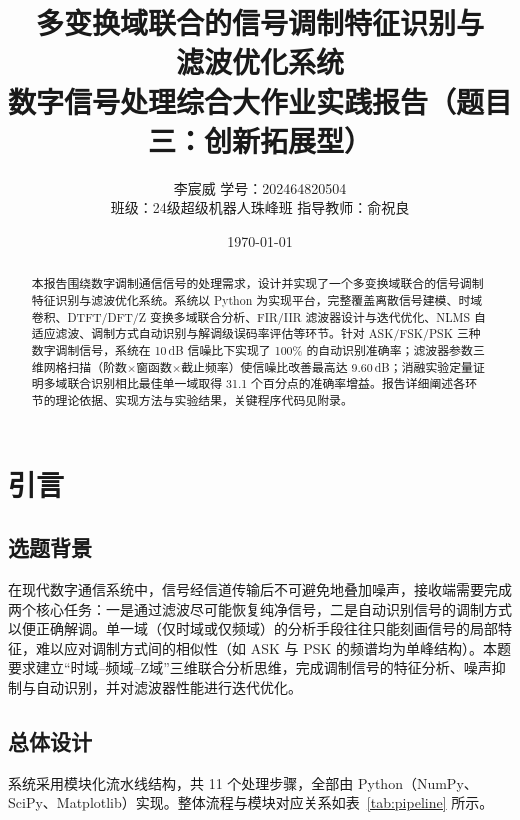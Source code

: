 \documentclass[12pt, a4paper, UTF8]{ctexart}
\title{\textbf{多变换域联合的信号调制特征识别与\\滤波优化系统}\\[0.5em]
\large 数字信号处理综合大作业实践报告（题目三：创新拓展型）}
\author{李宸威 \quad 学号：202464820504 \\[0.4em]
班级：24级超级机器人珠峰班 \quad 指导教师：俞祝良}
\date{\today}
\begin{document}
\maketitle

\begin{abstract}
本报告围绕数字调制通信信号的处理需求，设计并实现了一个多变换域联合的信号调制特征识别与滤波优化系统。系统以 Python 为实现平台，完整覆盖离散信号建模、时域卷积、DTFT/DFT/Z 变换多域联合分析、FIR/IIR 滤波器设计与迭代优化、NLMS 自适应滤波、调制方式自动识别与解调级误码率评估等环节。针对 ASK/FSK/PSK 三种数字调制信号，系统在 10\,dB 信噪比下实现了 100\% 的自动识别准确率；滤波器参数三维网格扫描（阶数$\times$窗函数$\times$截止频率）使信噪比改善最高达 9.60\,dB；消融实验定量证明多域联合识别相比最佳单一域取得 31.1 个百分点的准确率增益。报告详细阐述各环节的理论依据、实现方法与实验结果，关键程序代码见附录。
\end{abstract}

\tableofcontents
\newpage

\section{引言}

\subsection{选题背景}

在现代数字通信系统中，信号经信道传输后不可避免地叠加噪声，接收端需要完成两个核心任务：一是通过滤波尽可能恢复纯净信号，二是自动识别信号的调制方式以便正确解调。单一域（仅时域或仅频域）的分析手段往往只能刻画信号的局部特征，难以应对调制方式间的相似性（如 ASK 与 PSK 的频谱均为单峰结构）。本题要求建立``时域--频域--Z域''三维联合分析思维，完成调制信号的特征分析、噪声抑制与自动识别，并对滤波器性能进行迭代优化。

\subsection{总体设计}

系统采用模块化流水线结构，共 11 个处理步骤，全部由 Python（NumPy、SciPy、Matplotlib）实现。整体流程与模块对应关系如表~\ref{tab:pipeline} 所示。
\end{document}
